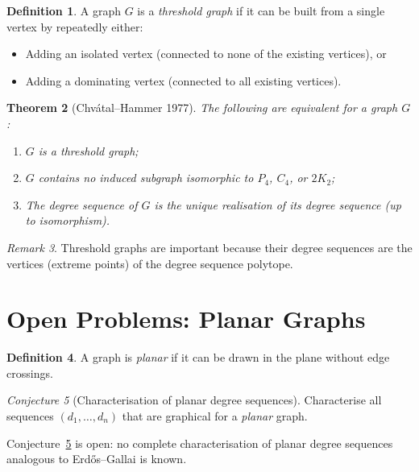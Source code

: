 \documentclass[12pt,a4paper]{amsart}
\newtheorem{theorem}{Theorem}[section]
\theoremstyle{definition}
\newtheorem{definition}[theorem]{Definition}
\theoremstyle{remark}
\newtheorem{remark}[theorem]{Remark}
\newtheorem{conjecture}[theorem]{Conjecture}
\begin{document}
\begin{definition}
A graph $G$ is a \emph{threshold graph} if it can be built from a single
vertex by repeatedly either:
\begin{itemize}[nosep]
  \item Adding an isolated vertex (connected to none of the existing vertices), or
  \item Adding a dominating vertex (connected to all existing vertices).
\end{itemize}
\end{definition}

\begin{theorem}[Chvátal--Hammer 1977]
The following are equivalent for a graph $G$:
\begin{enumerate}[label=(\roman*)]
  \item $G$ is a threshold graph;
  \item $G$ contains no induced subgraph isomorphic to $P_4$, $C_4$, or $2K_2$;
  \item The degree sequence of $G$ is the unique realisation of its degree
        sequence (up to isomorphism).
\end{enumerate}
\end{theorem}

\begin{remark}
Threshold graphs are important because their degree sequences are the vertices
(extreme points) of the degree sequence polytope.
\end{remark}

\section{Open Problems: Planar Graphs}

\begin{definition}
A graph is \emph{planar} if it can be drawn in the plane without edge crossings.
\end{definition}

\begin{conjecture}[Characterisation of planar degree sequences]
\label{conj:planar}
Characterise all sequences $(d_1, \ldots, d_n)$ that are graphical for a
\emph{planar} graph.
\end{conjecture}

Conjecture~\ref{conj:planar} is open: no complete characterisation of planar
degree sequences analogous to Erd\H{o}s--Gallai is known.
\end{document}
